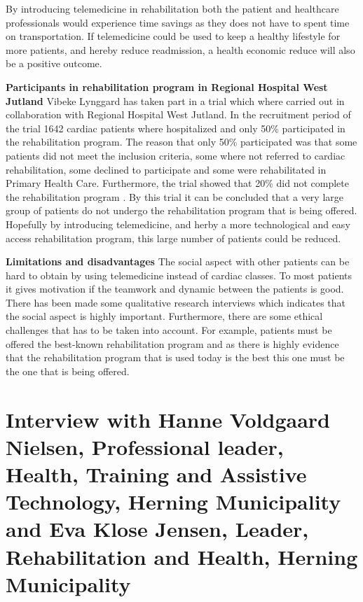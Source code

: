 By introducing telemedicine in rehabilitation both the patient and healthcare professionals would experience time savings as they does not have to spent time on transportation. If telemedicine could be used to keep a healthy lifestyle for more patients, and hereby reduce readmission, a health economic reduce will also be a positive outcome.

\textbf{Participants in rehabilitation program in Regional Hospital West Jutland} \newline
Vibeke Lynggard has taken part in a trial which where carried out in collaboration with Regional Hospital West Jutland. In the recruitment period of the trial 1642 cardiac patients where hospitalized and only 50\% participated in the rehabilitation program. The reason that only 50\% participated was that some patients did not meet the inclusion criteria, some where not referred to cardiac rehabilitation, some declined to participate and some were rehabilitated in Primary Health Care. Furthermore, the trial showed that 20\% did not complete the rehabilitation program \cite{rehabiliteringDK}. By this trial it can be concluded that a very large group of patients do not undergo the rehabilitation program that is being offered. Hopefully by introducing telemedicine, and herby a more technological and easy access rehabilitation program, this large number of patients could be reduced. 

\textbf{Limitations and disadvantages} \newline
The social aspect with other patients can be hard to obtain by using telemedicine instead of cardiac classes. To most patients it gives motivation if the teamwork and dynamic between the patients is good. There has been made some qualitative research interviews which indicates that the social aspect is highly important. Furthermore, there are some ethical challenges that has to be taken into account. For example, patients must be offered the best-known rehabilitation program and as there is highly evidence that the rehabilitation program that is used today is the best this one must be the one that is being offered.  

\section{Interview with Hanne Voldgaard Nielsen, Professional leader, Health, Training and Assistive Technology, Herning Municipality and Eva Klose Jensen, Leader, Rehabilitation and Health, Herning Municipality}\label{sec: evahanne}

